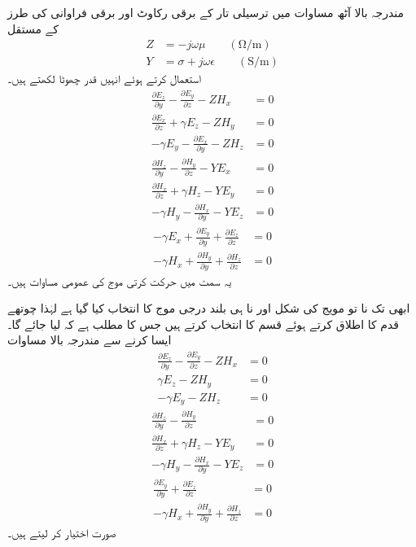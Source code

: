 مندرجہ بالا آٹھ مساوات میں ترسیلی تار کے برقی رکاوٹ  اور برقی فراوانی  کی طرز کے مستقل
\begin{align}\label{مساوت_مویج_رکاوٹ_فراوانی}
Z&=-j \omega \mu  \quad \quad \left(\si{\ohm / \meter} \right) \\
Y&=\sigma +j \omega \epsilon \quad \quad \left(\si{\siemens / \meter} \right)
\end{align}
استعمال کرتے ہوئے انہیں قدر چھوٹا لکھتے ہیں۔
\begin{align}
\frac{\partial E_z}{\partial y}-\frac{\partial E_y}{\partial z}-Z H_x&=0  \\
\frac{\partial E_x}{\partial z}+\gamma E_z-Z H_y&=0  \\
-\gamma E_y-\frac{\partial E_x}{\partial y}-Z H_z&=0
\end{align}
%
\begin{align}
\frac{\partial H_z}{\partial y}-\frac{\partial H_y}{\partial z}-YE_x&=0 \\
\frac{\partial H_x}{\partial z}+\gamma H_z-YE_y&=0  \\
-\gamma H_y-\frac{\partial H_x}{\partial y}-YE_z&=0 
\end{align}
%
\begin{align}
-\gamma E_x+\frac{\partial E_y}{\partial y}+\frac{\partial E_z}{\partial z}&=0 \\
-\gamma H_x+\frac{\partial H_y}{\partial y}+\frac{\partial H_z}{\partial z}&=0 \label{مساوات_مویج_مستطیلی_تیسرا_قدم_ختم}
\end{align}
 یہ  سمت میں حرکت کرتی موج کی عمومی مساوات ہیں۔

ابھی تک نا تو مویج کی شکل اور نا ہی بلند درجی موج  کا انتخاب کیا گیا ہے لہٰذا چوتھے قدم کا اطلاق کرتے ہوئے  قسم کا انتخاب کرتے ہیں جس کا مطلب ہے کہ  لیا جائے گا۔ایسا کرنے سے مندرجہ بالا مساوات   
\begin{align}
\frac{\partial E_z}{\partial y}-\frac{\partial E_y}{\partial z}-Z H_x&=0  \label{مساوات_میوج_الف}\\
\gamma E_z-Z H_y&=0  \label{مساوات_میوج_ب}\\
-\gamma E_y-Z H_z&=0\label{مساوات_میوج_پ}
\end{align}
%
\begin{align}
\frac{\partial H_z}{\partial y}-\frac{\partial H_y}{\partial z}&=0 \label{مساوات_میوج_ت}\\
\frac{\partial H_x}{\partial z}+\gamma H_z-YE_y&=0  \label{مساوات_میوج_ٹ}\\
-\gamma H_y-\frac{\partial H_x}{\partial y}-YE_z&=0 \label{مساوات_میوج_ث}
\end{align}
%
\begin{align}
\frac{\partial E_y}{\partial y}+\frac{\partial E_z}{\partial z}&=0 \label{مساوات_میوج_ج}\\
-\gamma H_x+\frac{\partial H_y}{\partial y}+\frac{\partial H_z}{\partial z}&=0\label{مساوات_میوج_چ}
\end{align}
صورت اختیار کر لیتے ہیں۔

